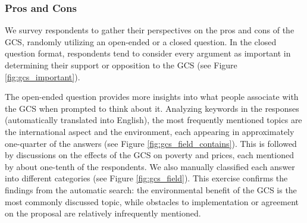 \begin{bibunit}
\subsubsection{Pros and Cons}\label{subsubsec:pros_cons}

We survey respondents to gather their perspectives on the pros and cons of the GCS, randomly utilizing an open-ended or a closed question. In the closed question format, respondents tend to consider every argument as important in determining their support or opposition to the GCS (see Figure \ref{fig:gcs_important}). 

The open-ended question provides more insights into what people associate with the GCS when prompted to think about it. %
Analyzing keywords in the responses (automatically translated into English), the most frequently mentioned topics are the international aspect and the environment, each appearing in approximately one-quarter of the answers (see Figure \ref{fig:gcs_field_contains}). This is followed by discussions on the effects of the GCS on poverty and prices, each mentioned by about one-tenth of the respondents. We also manually classified each answer into different categories (see Figure \ref{fig:gcs_field}). This exercise confirms the findings from the automatic search: the environmental benefit of the GCS is the most commonly discussed topic, while obstacles to implementation or agreement on the proposal are relatively infrequently mentioned.%


\end{bibunit}
